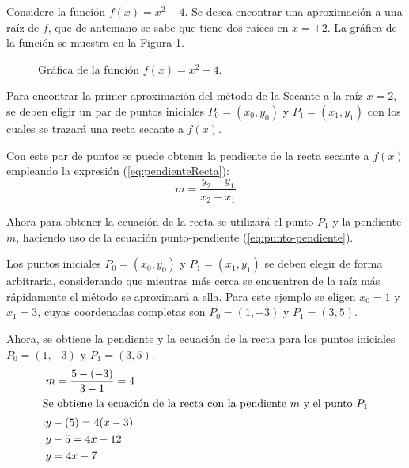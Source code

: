 \begin{exerciseT}

	Considere la función $f(x)=x^2-4$. Se desea encontrar una aproximación a una raíz de $f$, que de antemano se sabe
	que tiene dos raíces en $x=\pm 2$. La gráfica de la función se muestra en la Figura \ref{fig:Secante01}.

	\begin{figure}[H]
		\centering
		\caption{Gráfica de la función $f(x)=x^2-4$.}
		\label{fig:Secante01}
	\end{figure}

	Para encontrar la primer aproximación del método de la Secante a la raíz $x=2$, se deben eligir un par de puntos
	iniciales $P_0 = (x_0, y_0)$ y $P_1 = (x_1, y_1)$ con los cuales se trazará una recta secante a $f(x)$. 
	
	Con este par de puntos se puede obtener la pendiente de la recta secante a $f(x)$ empleando la expresión (\ref{eq:pendienteRecta}):
	\begin{equation}
		m = \dfrac{y_2-y_1}{x_2-x_1}	
		\label{eq:pendienteRecta}
	\end{equation}

	Ahora para obtener la ecuación de la recta se utilizará el punto $P_1$ y la pendiente $m$, haciendo uso de la ecuación punto-pendiente 
	(\ref{eq:punto-pendiente}).
	

	Los puntos iniciales $P_0 = (x_0, y_0)$ y $P_1 = (x_1, y_1)$ se deben elegir de forma arbitraria, considerando que mientras más cerca se 
	encuentren de la raíz más rápidamente el método se aproximará a ella. Para este ejemplo se eligen $x_0=1$ y $x_1=3$, cuyas coordenadas 
	completas son $P_0 = (1, -3)$ y $P_1 = (3, 5)$.

	Ahora, se obtiene la pendiente y la ecuación de la recta para los puntos iniciales $P_0 = (1, -3)$ y $P_1 = (3, 5)$.
	\begin{align*}
		& m = \dfrac{5-(-3)}{3-1} = 4\\
		\intertext{Se obtiene la ecuación de la recta con la pendiente $m$ y el punto $P_1$}:
		& y-(5) = 4(x-3) \\
		& y-5=4x-12\\
		& y = 4x - 7
	\end{align*}
	

\end{exerciseT}
